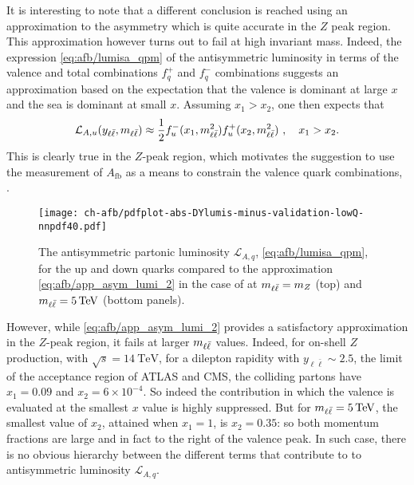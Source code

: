 It is interesting to note that a different conclusion is reached using an
approximation to the asymmetry which is quite accurate  in the $Z$ peak region.
%
This approximation however turns out to fail at high invariant mass.
%
Indeed, the expression \cref{eq:afb/lumisa_qpm} of the antisymmetric luminosity
in terms of the valence and total \pdf combinations $f_q^+$ and $f_q^-$ \pdf
combinations suggests an approximation based on the expectation that the
valence is dominant at large $x$ and the sea is dominant at small $x$.
Assuming $x_1> x_2$, one then expects that
\begin{equation}
\mathcal{L}_{A,u}(y_{\ell\bar{\ell}},m_{\ell\bar{\ell}}) \approx\frac {1}{2} f_u^-(x_1,m_{\ell\bar{\ell}}^2)
f_{u}^+(x_2,m_{\ell\bar{\ell}}^2)   \,  \, ,\quad x_1>x_2.
\label{eq:afb/app_asym_lumi_2}
\end{equation}
This is clearly true in the $Z$-peak region, which  motivates the suggestion to
use the measurement of $A_{\text{fb}}$ as a means to constrain the valence
quark combinations, \cite{Accomando:2019vqt}.

\begin{figure}[!t]
 \centering
 \texttt{[image: ch-afb/pdfplot-abs-DYlumis-minus-validation-lowQ-nnpdf40.pdf]}
 \caption{
   The  antisymmetric partonic luminosity $\mathcal{L}_{A,q}$,
   \cref{eq:afb/lumisa_qpm}, for the up and down quarks  compared to the
   approximation  \cref{eq:afb/app_asym_lumi_2} in the case of  at
   $m_{\ell\bar{\ell}}=m_Z$ (top) and $\mll=\SI{5}{\tera\electronvolt}$ (bottom panels).
 }    
 \label{fig:afb/pdfplot-abs-DYlumis-minus-validation-lowQ-nnpdf40}
\end{figure}

However, while \cref{eq:afb/app_asym_lumi_2} provides a satisfactory
approximation in the  $Z$-peak region, it fails at larger $m_{\ell\bar{\ell}}$ values.
Indeed, for on-shell $Z$ production, with
$\sqrt{s}=\SI{14}{\tera\electronvolt}$, for a dilepton rapidity with
$y_{\ell\bar{\ell}}\sim 2.5$, the limit of the acceptance region of ATLAS and
CMS, the colliding partons have $x_1=0.09$ and $x_2=6\times 10^{-4}$. 
So indeed the contribution in which the valence \pdf is evaluated at the
smallest $x$ value is highly suppressed.
%
But for $\mll=\SI{5}{\tera\electronvolt}$, the smallest value of $x_2$,
attained when $x_1=1$, is $x_2=0.35$: so both momentum fractions are large and
in fact to the right of the valence peak.
%
In such case, there  is no obvious hierarchy between the different terms that
contribute to to antisymmetric luminosity $\mathcal{L}_{A,q}$.

